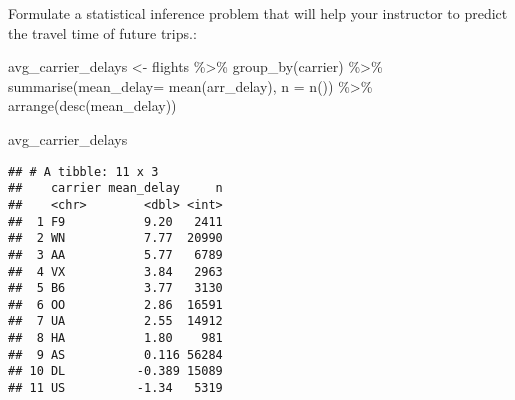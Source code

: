 \documentclass[
]{article}
\newenvironment{Shaded}{\begin{snugshade}}{\end{snugshade}}
\newcommand{\AttributeTok}[1]{\textcolor[rgb]{0.77,0.63,0.00}{#1}}
\newcommand{\FunctionTok}[1]{\textcolor[rgb]{0.00,0.00,0.00}{#1}}
\newcommand{\NormalTok}[1]{#1}
\newcommand{\OtherTok}[1]{\textcolor[rgb]{0.56,0.35,0.01}{#1}}
\newcommand{\SpecialCharTok}[1]{\textcolor[rgb]{0.00,0.00,0.00}{#1}}
\newcommand{\StringTok}[1]{\textcolor[rgb]{0.31,0.60,0.02}{#1}}
\begin{document}
\begin{Shaded}
\end{Shaded}

Formulate a statistical inference problem that will help your instructor
to predict the travel time of future trips.:

\begin{Shaded}
\begin{Highlighting}[]
\NormalTok{avg\_carrier\_delays }\OtherTok{\textless{}{-}}\NormalTok{ flights }\SpecialCharTok{\%\textgreater{}\%}
  \FunctionTok{group\_by}\NormalTok{(carrier) }\SpecialCharTok{\%\textgreater{}\%}
  \FunctionTok{summarise}\NormalTok{(}\AttributeTok{mean\_delay=} \FunctionTok{mean}\NormalTok{(arr\_delay), }\AttributeTok{n =} \FunctionTok{n}\NormalTok{()) }\SpecialCharTok{\%\textgreater{}\%}
  \FunctionTok{arrange}\NormalTok{(}\FunctionTok{desc}\NormalTok{(mean\_delay))}

\NormalTok{avg\_carrier\_delays}
\end{Highlighting}
\end{Shaded}

\begin{verbatim}
## # A tibble: 11 x 3
##    carrier mean_delay     n
##    <chr>        <dbl> <int>
##  1 F9           9.20   2411
##  2 WN           7.77  20990
##  3 AA           5.77   6789
##  4 VX           3.84   2963
##  5 B6           3.77   3130
##  6 OO           2.86  16591
##  7 UA           2.55  14912
##  8 HA           1.80    981
##  9 AS           0.116 56284
## 10 DL          -0.389 15089
## 11 US          -1.34   5319
\end{verbatim}
\end{document}

